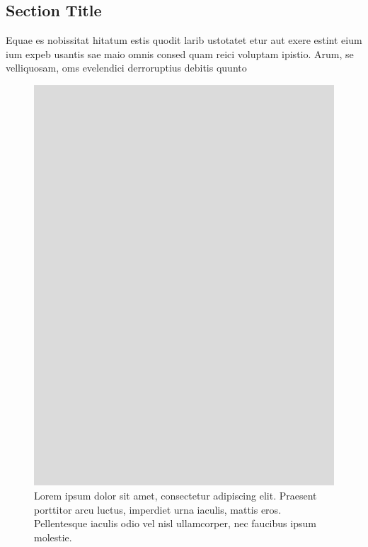 \documentclass[
	landscape,       %
]{ImperialPoster}
\begin{document}
\begin{multicols}{4}
	\columnbreak{} %

	\section{Section Title}

	Equae es nobissitat hitatum estis quodit larib ustotatet etur aut exere estint eium ium expeb usantis sae maio omnis consed quam reici voluptam ipistio. Arum, se velliquosam, oms evelendici derroruptius debitis quunto


	\begin{figure}[H] %
		\includegraphics[width=\linewidth]{../assets/images/Grey_4-3_Portrait.pdf} %
		\caption{Lorem ipsum dolor sit amet, consectetur adipiscing elit. Praesent porttitor arcu luctus, imperdiet urna iaculis, mattis eros. Pellentesque iaculis odio vel nisl ullamcorper, nec faucibus ipsum molestie.}
	\end{figure}


\end{multicols}
\end{document}

